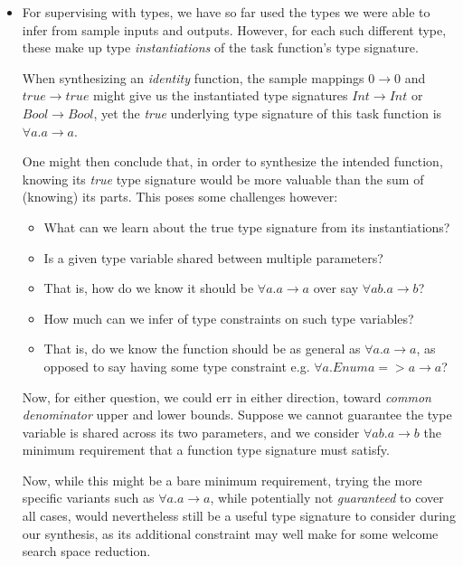 \documentclass{article}
\begin{document}
\begin{itemize}
    \item For supervising with types, we have so far used the types we were able to infer from sample inputs and outputs.
    However, for each such different type,
    these make up type \emph{instantiations} of the task function's type signature.

    When synthesizing an \emph{identity} function,
    the sample mappings $0 \rightarrow 0$ and $true \rightarrow true$
    might give us the instantiated type signatures
    $Int \rightarrow Int$ or $Bool \rightarrow Bool$,
    yet the \emph{true} underlying type signature of this task function is $\forall a . a \rightarrow a$.

    One might then conclude that, in order to synthesize the intended function,
    knowing its \emph{true} type signature would be more valuable than the sum of (knowing) its parts.
    This poses some challenges however:

    \begin{itemize}
        \item What can we learn about the true type signature from its instantiations?
        \item Is a given type variable shared between multiple parameters?
        \item That is, how do we know it should be $\forall a . a \rightarrow a$ over say $\forall a b . a \rightarrow b$?
        \item How much can we infer of type constraints on such type variables?
        \item That is, do we know the function should be as general as $\forall a . a \rightarrow a$, as opposed to say having some type constraint e.g. $\forall a . Enum a => a \rightarrow a$?
    \end{itemize}

    Now, for either question, we could err in either direction, toward \emph{common denominator} upper and lower bounds.
    Suppose we cannot guarantee the type variable is shared across its two parameters,
    and we consider $\forall a b . a \rightarrow b$ the minimum requirement that a function type signature must satisfy.

    Now, while this might be a bare minimum requirement,
    trying the more specific variants such as $\forall a . a \rightarrow a$,
    while potentially not \emph{guaranteed} to cover all cases,
    would nevertheless still be a useful type signature to consider during our synthesis,
    as its additional constraint may well make for some welcome search space reduction.


\end{itemize}
\end{document}
